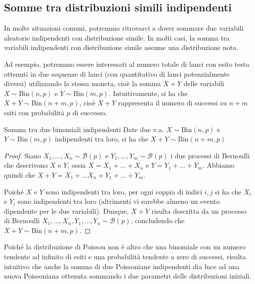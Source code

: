 \documentclass[a4paper, 12pt]{report}
\begin{document}
    \subsection{Somme tra distribuzioni simili indipendenti}

    In molte situazioni comuni, potremmo ritrovarci a dover sommare due variabili aleatorie indipendenti con distribuzione simile. In molti casi, la somma tra variabili indipendenti con distribuzione simile assume una distribuzione nota. 
    
    Ad esempio, potremmo essere interessati al numero totale di lanci con esito testa ottenuti in due sequenze di lanci (con quantitativo di lanci potenzialmente diversi) utilizzando la stessa moneta, cioè la somma $X+Y$ delle variabili $X \sim \mathrm{Bin}(n,p)$ e $Y \sim \mathrm{Bin}(m,p)$. Intuitivamente, si ha che $X + Y \sim \mathrm{Bin}(n+m, p)$, cioè $X+Y$ rappresenta il numero di successi su $n+m$ esiti con probabilità $p$ di successo.

    \begin{framedprop}{Somma tra due binomiali indipendenti}
        Date due v.a. $X \sim \mathrm{Bin}(n,p)$ e $Y \sim \mathrm{Bin}(m,p)$ indipendenti tra loro, si ha che $X + Y \sim \mathrm{Bin}(n+m, p)$
    \end{framedprop}

    \begin{proof}
        Siano $X_1, \ldots, X_n \sim \mathcal{B}(p)$ e $Y_1, \ldots, Y_m \sim \mathcal{B}(p)$ i due processi di Bernoulli che descrivono $X$ e $Y$, ossia $X = X_1 + \ldots + X_n$ e $Y = Y_1 + \ldots + Y_m$. Abbiamo quindi che $X+Y = X_1 + \ldots X_n + Y_1 +\ldots + Y_m$.
        
        Poiché $X$ e $Y$ sono indipendenti tra loro, per ogni coppia di indici $i,j$ si ha che $X_i$ e $Y_i$ sono indipendenti tra loro (altrimenti vi sarebbe almeno un evento dipendente per le due variabili). Dunque, $X+Y$ risulta descritta da un processo di Bernoulli $X_1, \ldots, X_n, Y_1, \ldots, Y_n \sim \mathcal{B}(p)$, concludendo che $X+Y \sim \mathrm{Bin}(n+m, p)$.
    \end{proof}

    Poiché la distribuzione di Poisson non è altro che una binomiale con un numero tendente ad infinito di esiti e una probabilità tendente a zero di successi, risulta intuitivo che anche la somma di due Poissoniane indipendenti dia luce ad una nuova Poissoniana ottenuta sommando i due parametri delle distribuzioni iniziali.
\end{document}
